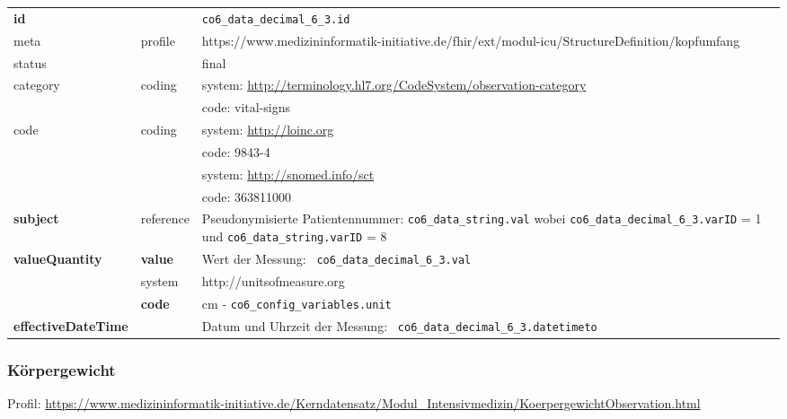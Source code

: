 \begin{longtable}{|l|l|p{7.5cm}|}
	\hline
	\rowcolor{lightgray} \multicolumn{3}{|l|}{Data Mapping (inhaltlich)} \\ \hline
	\textbf{id} &  & \texttt{co6\_data\_decimal\_6\_3.id} \\ \hline
	meta & profile & https://www.medizininformatik-initiative.de/fhir/ext/modul-icu/StructureDefinition/kopfumfang \\ \hline 
	status &  & final   \\ \hline 
	category & coding & system: \url{http://terminology.hl7.org/CodeSystem/observation-category} \\
	\cline{3-3}
	& & code: vital-signs \\ \hline
	code & coding & system: \url{http://loinc.org} \\ 
	\cline{3-3} 
	&  & code: 9843-4 \\ 
	\cline{3-3} 
	&  & system: \url{http://snomed.info/sct} \\ 
	\cline{3-3}
	&  & code: 363811000 \\ \hline
	\textbf{subject} & reference & Pseudonymisierte Patientennummer: \texttt{co6\_data\_string.val} wobei \texttt{co6\_data\_decimal\_6\_3.varID} = 1 und \texttt{co6\_data\_string.varID} = 8 \\ \hline
	\textbf{valueQuantity}  & \textbf{value} & Wert der Messung: \texttt{
		co6\_data\_decimal\_6\_3.val} \\
	\cline{2-3}
	& system & http://unitsofmeasure.org \\
	\cline{2-3}
	& \textbf{code} & cm - \texttt{co6\_config\_variables.unit} \\ \hline
	\textbf{effectiveDateTime}  & & Datum und Uhrzeit der Messung: \texttt{
		co6\_data\_decimal\_6\_3.datetimeto} \\ \hline
\end{longtable}

\subsubsection{Körpergewicht} 

Profil: \url{https://www.medizininformatik-initiative.de/Kerndatensatz/Modul_Intensivmedizin/KoerpergewichtObservation.html}

